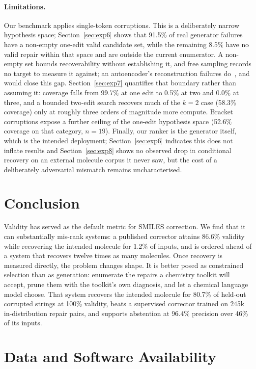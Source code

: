 \documentclass[journal=jcisd8,manuscript=article]{achemso}
\begin{document}
\paragraph{Limitations.}
Our benchmark applies single-token corruptions. This is a deliberately narrow
hypothesis space; Section~\ref{sec:exp6} shows that 91.5\% of real generator
failures have a non-empty one-edit valid candidate set, while the remaining
8.5\% have no valid repair within that space and are outside the current
enumerator. A non-empty set bounds recoverability without establishing it,
and free sampling records no target to measure it against; an autoencoder's
reconstruction failures do~\citep{park2026chemfixer}, and would close this gap. Section~\ref{sec:exp7}
quantifies that boundary rather than assuming it: coverage falls from 99.7\% at
one edit to 0.5\% at two and 0.0\% at three, and a bounded two-edit search
recovers much of the $k{=}2$ case (58.3\% coverage) only at roughly three orders
of magnitude more compute. Bracket corruptions expose a further ceiling of the
one-edit hypothesis space (52.6\% coverage on that category, $n=19$). Finally,
our ranker is the generator itself, which is the intended deployment;
Section~\ref{sec:exp6} indicates this does not inflate results and
Section~\ref{sec:exp8} shows no observed drop in conditional recovery on an
external molecule corpus it never saw, but the cost of a deliberately
adversarial mismatch remains uncharacterised.

\section{Conclusion}

Validity has served as the default metric for SMILES correction. We find that
it can substantially mis-rank systems: a published corrector attains 86.6\% validity
while recovering the intended molecule for 1.2\% of inputs, and is ordered ahead
of a system that recovers twelve times as many molecules. Once recovery is
measured directly, the problem changes shape. It is better posed as constrained
selection than as generation: enumerate the repairs a chemistry toolkit will
accept, prune them with the toolkit's own diagnosis, and let a chemical language
model choose. That system recovers the intended molecule for 80.7\% of held-out
corrupted strings at 100\% validity, beats a supervised corrector trained on
245k in-distribution repair pairs, and supports abstention at 96.4\% precision
over 46\% of its inputs.


\section*{Data and Software Availability}
\end{document}
